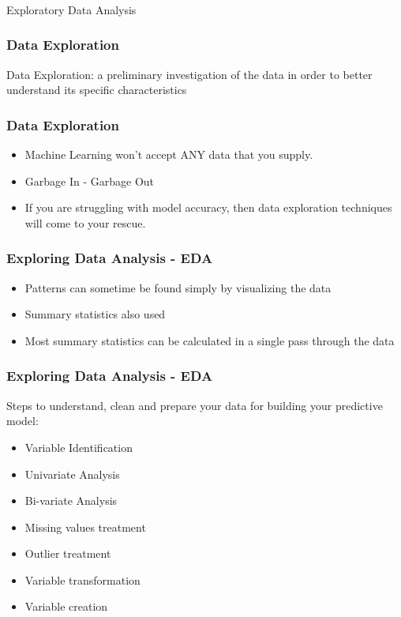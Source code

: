 \begin{frame}[fragile]\frametitle{}
\begin{center}
{\Large Exploratory Data Analysis}
\end{center}
\end{frame}

\begin{frame}[fragile]\frametitle{Data Exploration}	
Data Exploration: a preliminary investigation of the data in order to better understand its specific characteristics
\end{frame}

\begin{frame}[fragile]\frametitle{Data Exploration}	
\begin{itemize}
\item Machine Learning won't accept ANY data that you supply.
\item Garbage In - Garbage Out
\item If you are struggling with model accuracy, then data exploration techniques will come to your rescue.
\end{itemize}
\end{frame}



\begin{frame}[fragile]\frametitle{Exploring Data Analysis - EDA}	
\begin{itemize}
\item Patterns can sometime be found simply by visualizing the data
\item Summary statistics also used
\item Most summary statistics can be calculated in a single pass through the data
\end{itemize}
\end{frame}

\begin{frame}[fragile]\frametitle{Exploring Data Analysis - EDA}	
Steps to  understand, clean and prepare your data for building your 
predictive model: 

\begin{itemize}
\item Variable Identification 
\item Univariate Analysis 
\item Bi-variate Analysis 
\item Missing values treatment 
\item Outlier treatment 
\item Variable transformation 
\item Variable creation 
\end{itemize}
\end{frame}

